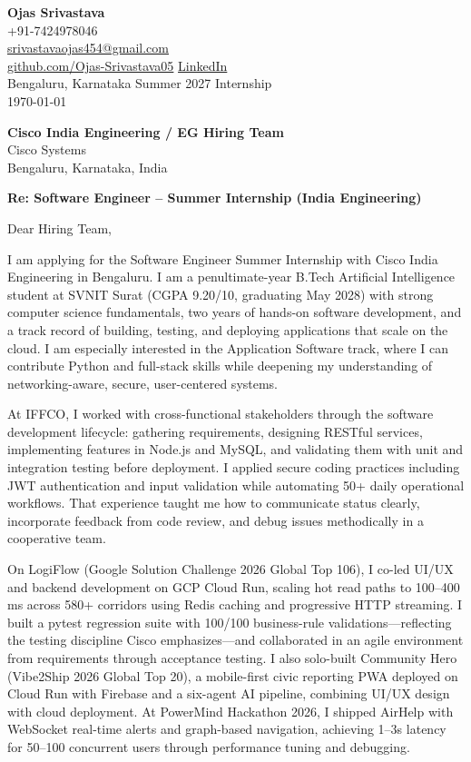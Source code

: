 \documentclass[a4paper,11pt]{article}
\begin{document}
\begin{flushright}
\textbf{Ojas Srivastava} \\
+91-7424978046 \\
\href{mailto:srivastavaojas454@gmail.com}{srivastavaojas454@gmail.com} \\
\href{https://github.com/Ojas-Srivastava05}{github.com/Ojas-Srivastava05} \textbar{}
\href{https://linkedin.com/in/ojas-srivastava05}{LinkedIn} \\
Bengaluru, Karnataka \textbar{} Summer 2027 Internship \\
\today
\end{flushright}

\vspace{4mm}
\textbf{Cisco India Engineering / EG Hiring Team} \\
Cisco Systems \\
Bengaluru, Karnataka, India

\vspace{2mm}
\textbf{Re: Software Engineer -- Summer Internship (India Engineering)}

Dear Hiring Team,

I am applying for the Software Engineer Summer Internship with Cisco India Engineering in Bengaluru. I am a penultimate-year B.Tech Artificial Intelligence student at SVNIT Surat (CGPA 9.20/10, graduating May 2028) with strong computer science fundamentals, two years of hands-on software development, and a track record of building, testing, and deploying applications that scale on the cloud. I am especially interested in the Application Software track, where I can contribute Python and full-stack skills while deepening my understanding of networking-aware, secure, user-centered systems.

At IFFCO, I worked with cross-functional stakeholders through the software development lifecycle: gathering requirements, designing RESTful services, implementing features in Node.js and MySQL, and validating them with unit and integration testing before deployment. I applied secure coding practices including JWT authentication and input validation while automating 50+ daily operational workflows. That experience taught me how to communicate status clearly, incorporate feedback from code review, and debug issues methodically in a cooperative team.

On LogiFlow (Google Solution Challenge 2026 Global Top 106), I co-led UI/UX and backend development on GCP Cloud Run, scaling hot read paths to 100--400 ms across 580+ corridors using Redis caching and progressive HTTP streaming. I built a pytest regression suite with 100/100 business-rule validations---reflecting the testing discipline Cisco emphasizes---and collaborated in an agile environment from requirements through acceptance testing. I also solo-built Community Hero (Vibe2Ship 2026 Global Top 20), a mobile-first civic reporting PWA deployed on Cloud Run with Firebase and a six-agent AI pipeline, combining UI/UX design with cloud deployment. At PowerMind Hackathon 2026, I shipped AirHelp with WebSocket real-time alerts and graph-based navigation, achieving 1--3s latency for 50--100 concurrent users through performance tuning and debugging.
\end{document}
